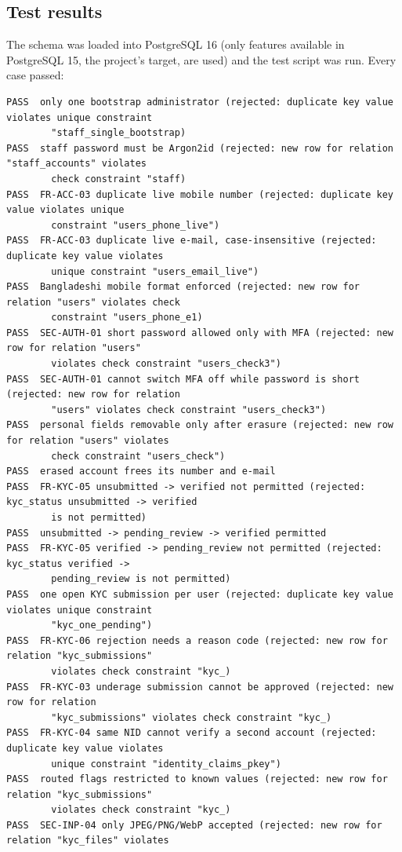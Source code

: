 \documentclass[11pt,a4paper]{article}
\begin{document}
\subsection{Test results}
\label{app:tests}
The schema was loaded into PostgreSQL 16 (only features available in PostgreSQL 15, the project's target, are used) and the test script was run. Every case passed:
{\scriptsize
\begin{verbatim}
PASS  only one bootstrap administrator (rejected: duplicate key value violates unique constraint
        "staff_single_bootstrap)
PASS  staff password must be Argon2id (rejected: new row for relation "staff_accounts" violates
        check constraint "staff)
PASS  FR-ACC-03 duplicate live mobile number (rejected: duplicate key value violates unique
        constraint "users_phone_live")
PASS  FR-ACC-03 duplicate live e-mail, case-insensitive (rejected: duplicate key value violates
        unique constraint "users_email_live")
PASS  Bangladeshi mobile format enforced (rejected: new row for relation "users" violates check
        constraint "users_phone_e1)
PASS  SEC-AUTH-01 short password allowed only with MFA (rejected: new row for relation "users"
        violates check constraint "users_check3")
PASS  SEC-AUTH-01 cannot switch MFA off while password is short (rejected: new row for relation
        "users" violates check constraint "users_check3")
PASS  personal fields removable only after erasure (rejected: new row for relation "users" violates
        check constraint "users_check")
PASS  erased account frees its number and e-mail
PASS  FR-KYC-05 unsubmitted -> verified not permitted (rejected: kyc_status unsubmitted -> verified
        is not permitted)
PASS  unsubmitted -> pending_review -> verified permitted
PASS  FR-KYC-05 verified -> pending_review not permitted (rejected: kyc_status verified ->
        pending_review is not permitted)
PASS  one open KYC submission per user (rejected: duplicate key value violates unique constraint
        "kyc_one_pending")
PASS  FR-KYC-06 rejection needs a reason code (rejected: new row for relation "kyc_submissions"
        violates check constraint "kyc_)
PASS  FR-KYC-03 underage submission cannot be approved (rejected: new row for relation
        "kyc_submissions" violates check constraint "kyc_)
PASS  FR-KYC-04 same NID cannot verify a second account (rejected: duplicate key value violates
        unique constraint "identity_claims_pkey")
PASS  routed flags restricted to known values (rejected: new row for relation "kyc_submissions"
        violates check constraint "kyc_)
PASS  SEC-INP-04 only JPEG/PNG/WebP accepted (rejected: new row for relation "kyc_files" violates

\end{verbatim}}
\end{document}
